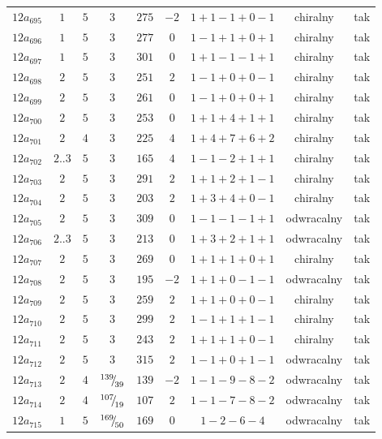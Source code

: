 \begin{longtable}{ccccccccc}
$12a_{695}$ & $1$ & $5$ & $3$ & $275$ & $-2$ & $1+1-1+0-1$ & chiralny & tak \\
$12a_{696}$ & $1$ & $5$ & $3$ & $277$ & $0$ & $1-1+1+0+1$ & chiralny & tak \\
$12a_{697}$ & $1$ & $5$ & $3$ & $301$ & $0$ & $1+1-1-1+1$ & chiralny & tak \\
$12a_{698}$ & $2$ & $5$ & $3$ & $251$ & $2$ & $1-1+0+0-1$ & chiralny & tak \\
$12a_{699}$ & $2$ & $5$ & $3$ & $261$ & $0$ & $1-1+0+0+1$ & chiralny & tak \\
$12a_{700}$ & $2$ & $5$ & $3$ & $253$ & $0$ & $1+1+4+1+1$ & chiralny & tak \\
$12a_{701}$ & $2$ & $4$ & $3$ & $225$ & $4$ & $1+4+7+6+2$ & chiralny & tak \\
$12a_{702}$ & $2..3$ & $5$ & $3$ & $165$ & $4$ & $1-1-2+1+1$ & chiralny & tak \\
$12a_{703}$ & $2$ & $5$ & $3$ & $291$ & $2$ & $1+1+2+1-1$ & chiralny & tak \\
$12a_{704}$ & $2$ & $5$ & $3$ & $203$ & $2$ & $1+3+4+0-1$ & chiralny & tak \\
$12a_{705}$ & $2$ & $5$ & $3$ & $309$ & $0$ & $1-1-1-1+1$ & odwracalny & tak \\
$12a_{706}$ & $2..3$ & $5$ & $3$ & $213$ & $0$ & $1+3+2+1+1$ & odwracalny & tak \\
$12a_{707}$ & $2$ & $5$ & $3$ & $269$ & $0$ & $1+1+1+0+1$ & chiralny & tak \\
$12a_{708}$ & $2$ & $5$ & $3$ & $195$ & $-2$ & $1+1+0-1-1$ & odwracalny & tak \\
$12a_{709}$ & $2$ & $5$ & $3$ & $259$ & $2$ & $1+1+0+0-1$ & chiralny & tak \\
$12a_{710}$ & $2$ & $5$ & $3$ & $299$ & $2$ & $1-1+1+1-1$ & chiralny & tak \\
$12a_{711}$ & $2$ & $5$ & $3$ & $243$ & $2$ & $1+1+1+0-1$ & chiralny & tak \\
$12a_{712}$ & $2$ & $5$ & $3$ & $315$ & $2$ & $1-1+0+1-1$ & odwracalny & tak \\
$12a_{713}$ & $2$ & $4$ & ${}^{139}{\mskip -5mu/\mskip -3mu}_{39}$ & $139$ & $-2$ & $1-1-9-8-2$ & odwracalny & tak \\
$12a_{714}$ & $2$ & $4$ & ${}^{107}{\mskip -5mu/\mskip -3mu}_{19}$ & $107$ & $2$ & $1-1-7-8-2$ & odwracalny & tak \\
$12a_{715}$ & $1$ & $5$ & ${}^{169}{\mskip -5mu/\mskip -3mu}_{50}$ & $169$ & $0$ & $1-2-6-4$ & odwracalny & tak \\

\end{longtable}
